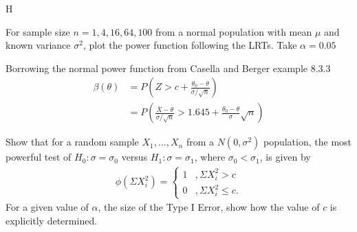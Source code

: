 \documentclass[12pt,letterpaper]{exam}
\begin{document}
\begin{questions}
	\begin{solution}
		H
	\end{solution}
	
	
	\setcounter{question}{12-1}
	
	\question 
	For sample size \(n = 1, 4, 16, 64, 100\) from a normal population with mean \(\mu\) and known variance \(\sigma^2\), 
	plot the power function following the LRTs. Take \(\alpha = 0.05\)
	
	\begin{solution}
		Borrowing the normal power function from Casella and Berger example 8.3.3
		\begin{align*}
			\beta(\theta)
			&= P\left(Z>c+\frac{\theta_0-\theta}{\sigma/\sqrt{n}}\right) \\
			&= P\left(\frac{\bar{X}-\theta}{\sigma/\sqrt{n}}>1.645+\frac{\theta_0-\theta}{\sigma}\sqrt{n}\right)
		\end{align*}
	\end{solution}
	
	
	\setcounter{question}{15-1}
	
	\question 
	Show that for a random sample $X_1, ..., X_n$ from a $N(0,\sigma^2)$ population, 
	the most powerful test of $H_0: \sigma = \sigma_0$ versus $H_1: \sigma = \sigma_1$, 
	where $\sigma_0 < \sigma_1$, is given by
	\begin{align*}
		\phi\left(\Sigma X_i^2\right) =
		\begin{cases}
			1 &, \Sigma X_i^2 > c \\
			0 &, \Sigma X_i^2 \le c.
		\end{cases}
	\end{align*}
	For a given value of $\alpha$, the size of the Type I Error, show how the value of $c$ is explicitly determined.
	

\end{questions}
\end{document}
